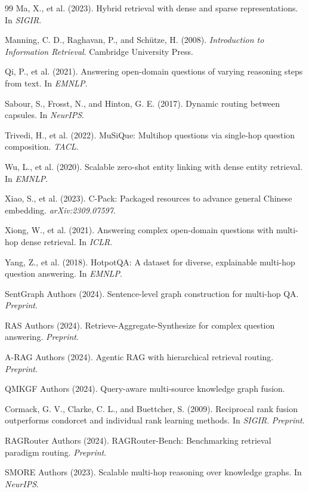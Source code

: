 \documentclass[11pt,a4paper]{article}
\begin{document}
\begin{thebibliography}{99}
Ma, X., et al. (2023).
Hybrid retrieval with dense and sparse representations.
In \textit{SIGIR}.

Manning, C. D., Raghavan, P., and Schütze, H. (2008).
\textit{Introduction to Information Retrieval}.
Cambridge University Press.

Qi, P., et al. (2021).
Answering open-domain questions of varying reasoning steps from text.
In \textit{EMNLP}.

Sabour, S., Frosst, N., and Hinton, G. E. (2017).
Dynamic routing between capsules.
In \textit{NeurIPS}.

Trivedi, H., et al. (2022).
MuSiQue: Multihop questions via single-hop question composition.
\textit{TACL}.

Wu, L., et al. (2020).
Scalable zero-shot entity linking with dense entity retrieval.
In \textit{EMNLP}.

Xiao, S., et al. (2023).
C-Pack: Packaged resources to advance general Chinese embedding.
\textit{arXiv:2309.07597}.

Xiong, W., et al. (2021).
Answering complex open-domain questions with multi-hop dense retrieval.
In \textit{ICLR}.

Yang, Z., et al. (2018).
HotpotQA: A dataset for diverse, explainable multi-hop question answering.
In \textit{EMNLP}.

SentGraph Authors (2024).
Sentence-level graph construction for multi-hop QA.
\textit{Preprint}.

RAS Authors (2024).
Retrieve-Aggregate-Synthesize for complex question answering.
\textit{Preprint}.

A-RAG Authors (2024).
Agentic RAG with hierarchical retrieval routing.
\textit{Preprint}.

QMKGF Authors (2024).
Query-aware multi-source knowledge graph fusion.

Cormack, G. V., Clarke, C. L., and Buettcher, S. (2009).
Reciprocal rank fusion outperforms condorcet and individual rank learning methods.
In \textit{SIGIR}.
\textit{Preprint}.

RAGRouter Authors (2024).
RAGRouter-Bench: Benchmarking retrieval paradigm routing.
\textit{Preprint}.

SMORE Authors (2023).
Scalable multi-hop reasoning over knowledge graphs.
In \textit{NeurIPS}.

\end{thebibliography}
\end{document}
